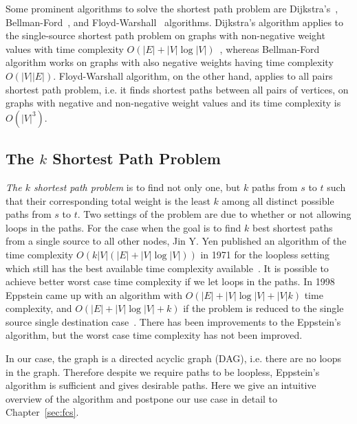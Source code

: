 Some prominent algorithms to solve the shortest path problem are Dijkstra's~\cite{dijkstra}, Bellman-Ford~\cite{bellman-ford}, and Floyd-Warshall~\cite{floyd-warshall} algorithms. Dijkstra's algorithm applies to the single-source shortest path problem on graphs with non-negative weight values with time complexity $O(|E| + |V| \log |V|)$~\cite{fredman1987fibonacci}, whereas Bellman-Ford algorithm works on graphs with also negative weights having time complexity $O(|V| |E|)$. Floyd-Warshall algorithm, on the other hand, applies to all pairs shortest path problem, i.e. it finds shortest paths between all pairs of vertices, on graphs with negative and non-negative weight values and its time complexity is $O(|V|^3)$.

\subsection{The $k$ Shortest Path Problem}
\emph{The $k$ shortest path problem} is to find not only one, but $k$ paths from $s$ to $t$ such that their corresponding total weight is the least $k$ among all distinct possible paths from $s$ to $t$. Two settings of the problem are due to whether or not allowing loops in the paths. For the case when the goal is to find $k$ best shortest paths from a single source to all other nodes, Jin Y. Yen published an algorithm of the time complexity $O(k |V|(|E|+|V|\log|V|))$ in 1971 for the loopless setting which still has the best available time complexity available~\cite{yen1971finding}. It is possible to achieve better worst case time complexity if we let loops in the paths. In 1998 Eppstein came up with an algorithm with $O(|E| + |V|\log|V| + |V| k)$ time complexity, and $O(|E| + |V|\log|V| + k)$ if the problem is reduced to the single source single destination case~\cite{eppstein1998finding}. There has been improvements to the Eppstein's algorithm, but the worst case time complexity has not been improved.

In our case, the graph is a directed acyclic graph (DAG), i.e. there are no loops in the graph. Therefore despite we require paths to be loopless, Eppstein's algorithm is sufficient and gives desirable paths. Here we give an intuitive overview of the algorithm and postpone our use case in detail to Chapter~\ref{sec:fcs}.

